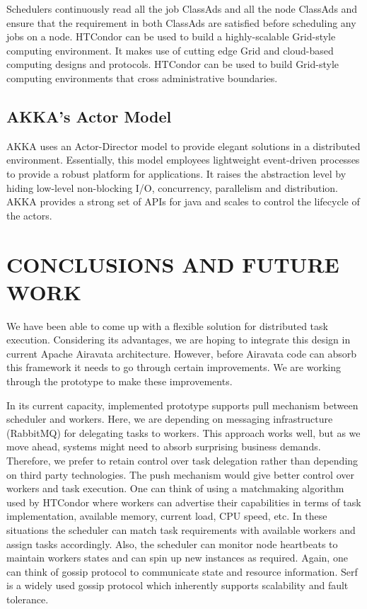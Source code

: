 \documentclass[sigconf]{acmart}
\begin{document}
Schedulers continuously read all the job ClassAds and all the node ClassAds and ensure that the requirement in both ClassAds are satisfied before scheduling any jobs on a node. HTCondor can be used to build a highly-scalable Grid-style computing environment.  It makes use of cutting edge Grid and cloud-based computing designs and protocols. HTCondor can be used to build Grid-style computing environments that cross administrative boundaries. 

\subsection{AKKA's Actor Model}
AKKA uses an Actor-Director model to provide elegant solutions in a distributed environment. Essentially, this model employees lightweight event-driven processes to provide a robust platform for applications. It raises the abstraction level by hiding low-level non-blocking I/O, concurrency, parallelism and distribution. AKKA provides a strong set of APIs for java and scales to control the lifecycle of the actors.

\section{CONCLUSIONS AND FUTURE WORK}
We have been able to come up with a flexible solution for distributed task execution. Considering its advantages, we are hoping to integrate this design in current Apache Airavata architecture. However, before Airavata code can absorb this framework it needs to go through certain improvements. We are working through the prototype to make these improvements. \newline

In its current capacity, implemented prototype supports pull mechanism between scheduler and workers. Here, we are depending on messaging infrastructure (RabbitMQ) for delegating tasks to workers. This approach works well, but as we move ahead, systems might need to absorb surprising business demands.  Therefore, we prefer to retain control over task delegation rather than depending on third party technologies. The push mechanism would give better control over workers and task execution. One can think of using a matchmaking algorithm used by HTCondor where workers can advertise their capabilities in terms of task implementation, available memory, current load, CPU speed, etc.  In these situations the scheduler can match task requirements with available workers and assign tasks accordingly. Also, the scheduler can monitor node heartbeats to maintain worker\textquotesingle s states and can spin up new instances as required. Again, one can think of gossip protocol to communicate state and resource information. Serf is a widely used gossip protocol which inherently supports scalability and fault tolerance. \newline
\end{document}

